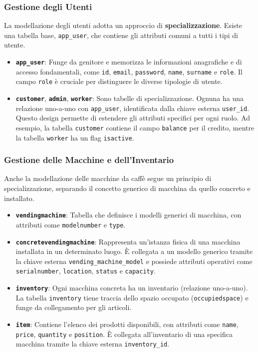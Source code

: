\subsubsection{Gestione degli Utenti}
La modellazione degli utenti adotta un approccio di \textbf{specializzazione}. Esiste una tabella base, \texttt{app\_user}, che contiene gli attributi comuni a tutti i tipi di utente.
\begin{itemize}
    \item \textbf{\texttt{app\_user}}: Funge da genitore e memorizza le informazioni anagrafiche e di accesso fondamentali, come \texttt{id}, \texttt{email}, \texttt{password}, \texttt{name}, \texttt{surname} e \texttt{role}. Il campo \texttt{role} è cruciale per distinguere le diverse tipologie di utente.
    \item \textbf{\texttt{customer}}, \textbf{\texttt{admin}}, \textbf{\texttt{worker}}: Sono tabelle di specializzazione. Ognuna ha una relazione uno-a-uno con \texttt{app\_user}, identificata dalla chiave esterna \texttt{user\_id}. Questo design permette di estendere gli attributi specifici per ogni ruolo. Ad esempio, la tabella \texttt{customer} contiene il campo \texttt{balance} per il credito, mentre la tabella \texttt{worker} ha un flag \texttt{isactive}.
\end{itemize}

\subsubsection{Gestione delle Macchine e dell'Inventario}
Anche la modellazione delle macchine da caffè segue un principio di specializzazione, separando il concetto generico di macchina da quello concreto e installato.
\begin{itemize}
    \item \textbf{\texttt{vendingmachine}}: Tabella che definisce i modelli generici di macchina, con attributi come \texttt{modelnumber} e \texttt{type}.
    \item \textbf{\texttt{concretevendingmachine}}: Rappresenta un'istanza fisica di una macchina installata in un determinato luogo. È collegata a un modello generico tramite la chiave esterna \texttt{vending\_machine\_model} e possiede attributi operativi come \texttt{serialnumber}, \texttt{location}, \texttt{status} e \texttt{capacity}.
    \item \textbf{\texttt{inventory}}: Ogni macchina concreta ha un inventario (relazione uno-a-uno). La tabella \texttt{inventory} tiene traccia dello spazio occupato (\texttt{occupiedspace}) e funge da collegamento per gli articoli.
    \item \textbf{\texttt{item}}: Contiene l'elenco dei prodotti disponibili, con attributi come \texttt{name}, \texttt{price}, \texttt{quantity} e \texttt{position}. È collegata all'inventario di una specifica macchina tramite la chiave esterna \texttt{inventory\_id}.
\end{itemize}

